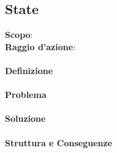 \subsection{State}


\textbf{Scopo}:  \\
\textbf{Raggio d'azione}: 

\paragraph{Definizione}

\paragraph{Problema}

\paragraph{Soluzione} 

\paragraph{Struttura e Conseguenze} 

\newpage